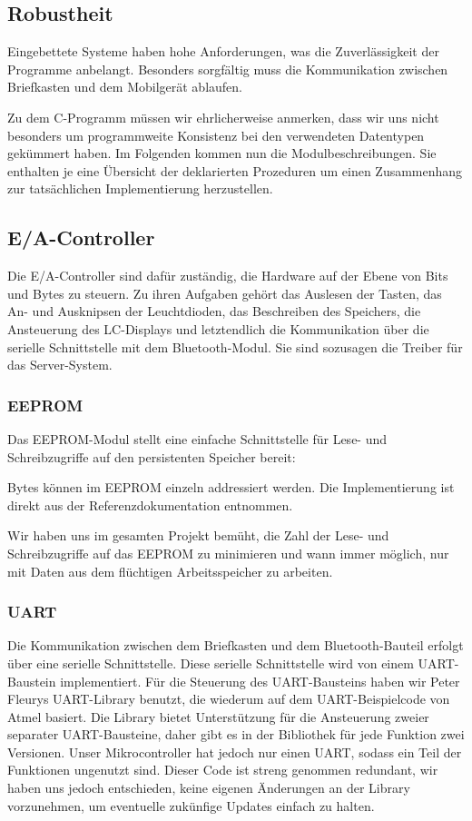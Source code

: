 \documentclass[ngerman]{article}
\begin{document}
\subsection{Robustheit}

Eingebettete Systeme haben hohe Anforderungen, was die Zuverlässigkeit
der Programme anbelangt. Besonders sorgfältig muss die Kommunikation
zwischen Briefkasten und dem Mobilgerät ablaufen.

Zu dem C-Programm müssen wir ehrlicherweise anmerken, dass wir uns nicht
besonders um programmweite Konsistenz bei den verwendeten Datentypen
ge\-kümmert haben. Im Folgenden kommen nun die Modulbeschreibungen. Sie
enthalten je eine Übersicht der deklarierten Prozeduren um einen Zusammenhang
zur tatsächlichen Implementierung herzustellen.


\subsection{E/A-Controller}

Die E/A-Controller sind dafür zuständig, die Hardware auf der Ebene von Bits
und Bytes zu steuern. Zu ihren Aufgaben gehört das Auslesen der Tasten, das An-
und Ausknipsen der Leuchtdioden,  das Beschreiben des Speichers, die
Ansteuerung des LC-Displays und letztendlich die Kommunikation über die
serielle Schnittstelle mit dem Bluetooth-Modul. Sie sind sozusagen die Treiber
für das Server-System.

\subsubsection{EEPROM}

Das EEPROM-Modul stellt eine einfache Schnittstelle für Lese- und
Schreibzugriffe auf den persistenten Speicher bereit:
 


Bytes können im EEPROM einzeln addressiert werden. Die Implementierung ist
direkt aus der Referenzdokumentation entnommen.

Wir haben uns im gesamten Projekt bemüht, die Zahl der Lese- und
Schreibzugriffe auf das EEPROM zu minimieren und wann immer möglich, nur mit
Daten aus dem flüchtigen Arbeitsspeicher zu arbeiten.

\subsubsection{UART}

Die Kommunikation zwischen dem Briefkasten und dem Bluetooth-Bauteil erfolgt
über eine serielle Schnittstelle. Diese serielle Schnittstelle wird von
einem UART-Baustein implementiert. Für die Steuerung des UART-Bausteins haben
wir  Peter Fleurys UART-Library benutzt, die wiederum auf dem UART-Beispielcode 
von Atmel basiert. Die Library bietet Unterstützung für die Ansteuerung zweier
separater UART-Bausteine, daher gibt es in der Bibliothek für jede Funktion
zwei Versionen. Unser Mikrocontroller hat jedoch nur einen UART, sodass ein
Teil der Funktionen ungenutzt sind. Dieser Code ist streng genommen redundant,
wir haben uns jedoch entschieden, keine eigenen Änderungen an der Library
vorzunehmen, um eventuelle zukünfige Updates einfach zu halten.
\end{document}
